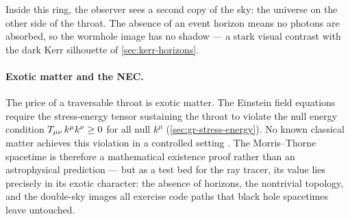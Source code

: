 Inside this ring, the observer sees a second copy of the sky: the
universe on the other side of the throat.  The absence of an event
horizon means no photons are absorbed, so the wormhole image has no
shadow --- a stark visual contrast with the dark Kerr silhouette of
\cref{sec:kerr-horizons}.

\paragraph{Exotic matter and the NEC.}

The price of a traversable throat is exotic matter.  The Einstein
field equations require the stress-energy tensor sustaining the
throat to violate the null energy condition
$T_{\mu\nu}\, k^\mu k^\nu \geq 0$ for all null $k^\mu$
(\cref{sec:gr-stress-energy}).  No known classical matter
achieves this violation in a controlled setting
\cite{MorrisThorne1988}.  The Morris--Thorne spacetime is therefore a
mathematical existence proof rather than an astrophysical prediction
--- but as a test bed for the ray tracer, its value lies precisely in
its exotic character: the absence of horizons, the nontrivial
topology, and the double-sky images all exercise code paths that
black hole spacetimes leave untouched.
